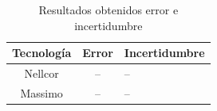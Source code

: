 \documentclass[journal]{IEEEtran}
\begin{document}
%


	\begin{table}[h!]
	\centering
	
	\caption{Resultados obtenidos error e incertidumbre
	}
	\def\arraystretch{1.2}%
	\begin{tabular}{c c l}
		
		\hline
		\textbf{Tecnología} & \multicolumn{1}{c}{\textbf{Error}} & \textbf{Incertidumbre}	\\ 
		\hline
		Nellcor  &--	& --\\
		Massimo  &--	& --\\		

		
		\hline
	\end{tabular}%
	\label{cuadro:resultados_sn_sp}%
\end{table}%
\end{document}

